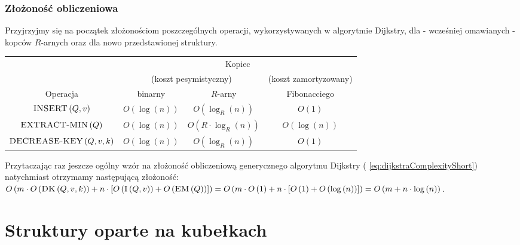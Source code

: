 \subsubsection{Złożoność obliczeniowa}

Przyjrzyjmy się na początek złożonościom poszczególnych operacji, wykorzystywanych w algorytmie Dijkstry, dla - wcześniej omawianych - kopców $R$-arnych oraz dla nowo przedstawionej struktury.

\begin{center}
	\begin{tabular}{cccc}
		& \multicolumn{3}{c}{Kopiec} \\
		\cline{2-4}
		& \multicolumn{2}{c}{\small{(koszt pesymistyczny)}} & \small{(koszt zamortyzowany)} \\
		\cline{2-4}
		Operacja & binarny & $R$-arny & Fibonacciego \\
		\hline
		$\textrm{\textsc{INSERT}} \left( Q, v \right)$ & $O \left( \log \left( n \right) \right)$ & $O \left( \log_{R} \left( n \right) \right)$ & $ O \left( 1 \right)$ \\
		$\textrm{\textsc{EXTRACT-MIN}} \left( Q \right)$ & $O \left( \log \left( n \right) \right)$ & $O \left( R \cdot \log_{R} \left( n \right) \right)$ & $O \left( \log \left( n \right) \right)$ \\
		$\textrm{\textsc{DECREASE-KEY}} \left( Q, v, k \right)$ & $O \left( \log \left( n \right) \right)$ & $O \left( \log_{R} \left( n \right) \right)$ & $ O \left( 1 \right)$ \\
		\hline
	\end{tabular}
\end{center}

Przytaczając raz jeszcze ogólny wzór na złożoność obliczeniową generycznego algorytmu Dijkstry ( \ref{eq:dijkstraComplexityShort}) natychmiast otrzymamy następującą złożoność: $ O \left( m \cdot O \left( \textrm{\textsc{DK}} \left( Q, v, k \right) \right) + n \cdot \left[ O \left( \textrm{\textsc{I}} \left( Q, v \right) \right) + O \left( \textrm{\textsc{EM}} \left( Q \right) \right) \right] \right) = O \left( m \cdot O \left( 1 \right) + n \cdot \left[ O \left( 1 \right) + O \left( \log \left( n \right) \right) \right] \right) = O \left( m + n \cdot \log \left( n \right) \right)$.

\newpage

\section{Struktury oparte na kubełkach}
\label{sec:dijkstraBuckets}

